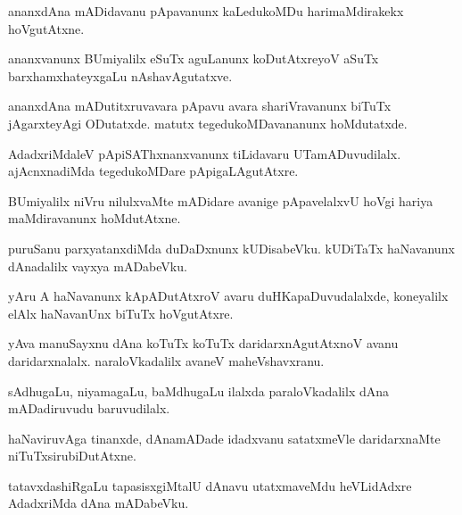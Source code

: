 \begin{mng}
ananxdAna mADidavanu pApavanunx kaLedukoMDu harimaMdirakekx hoVgutAtxne.
\end{mng}

\begin{mng}
ananxvanunx BUmiyalilx eSuTx aguLanunx koDutAtxreyoV aSuTx barxhamxhateyxgaLu nAshavAgutatxve.
\end{mng}

\begin{mng}
ananxdAna mADutitxruvavara pApavu avara shariVravanunx biTuTx jAgarxteyAgi ODutatxde. matutx tegedukoMDavananunx hoMdutatxde.
\end{mng}

\begin{mng}
AdadxriMdaleV pApiSAThxnanxvanunx tiLidavaru UTamADuvudilalx. ajAcnxnadiMda tegedukoMDare pApigaLAgutAtxre.
\end{mng}

\begin{mng}
BUmiyalilx niVru nilulxvaMte mADidare avanige pApavelalxvU hoVgi hariya maMdiravanunx hoMdutAtxne.
\end{mng}

\begin{mng}
puruSanu parxyatanxdiMda duDaDxnunx kUDisabeVku. kUDiTaTx haNavanunx dAnadalilx vayxya mADabeVku.
\end{mng}

\begin{mng}
yAru A haNavanunx kApADutAtxroV avaru duHKapaDuvudalalxde, koneyalilx elAlx haNavanUnx biTuTx hoVgutAtxre.
\end{mng}

\begin{mng}
yAva manuSayxnu dAna koTuTx koTuTx daridarxnAgutAtxnoV avanu daridarxnalalx. naraloVkadalilx avaneV maheVshavxranu.
\end{mng}

\begin{mng}
sAdhugaLu, niyamagaLu, baMdhugaLu ilalxda paraloVkadalilx dAna mADadiruvudu baruvudilalx.
\end{mng}

\begin{mng}
haNaviruvAga tinanxde, dAnamADade idadxvanu satatxmeVle daridarxnaMte niTuTxsirubiDutAtxne.
\end{mng}

\begin{mng}
tatavxdashiRgaLu tapasisxgiMtalU dAnavu utatxmaveMdu heVLidAdxre AdadxriMda dAna mADabeVku.
\end{mng}

